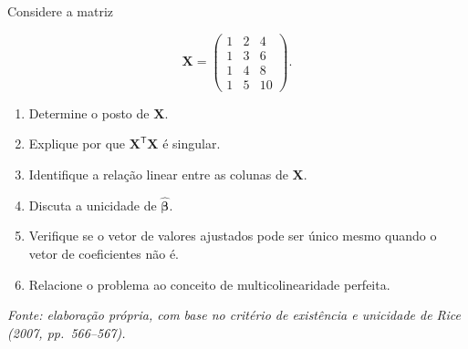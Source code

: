 \documentclass[
  letterpaper,
  DIV=11,
  numbers=noendperiod]{scrreprt}
\providecommand{\tightlist}{%
  \setlength{\itemsep}{0pt}\setlength{\parskip}{0pt}}\usepackage{longtable,booktabs,array}
\begin{document}
\begin{tcolorbox}[enhanced jigsaw, colback=white, leftrule=.75mm, colbacktitle=quarto-callout-tip-color!10!white, breakable, titlerule=0mm, bottomtitle=1mm, title=\textcolor{quarto-callout-tip-color}{\faLightbulb}\hspace{0.5em}{Exercício 6 --- Falta de posto completo}, colframe=quarto-callout-tip-color-frame, toprule=.15mm, opacityback=0, bottomrule=.15mm, opacitybacktitle=0.6, arc=.35mm, toptitle=1mm, rightrule=.15mm, coltitle=black, left=2mm]

Considere a matriz

\[\mathbf{X}
=
\begin{pmatrix}
1&2&4\\
1&3&6\\
1&4&8\\
1&5&10
\end{pmatrix}.\]

\begin{enumerate}
\def\labelenumi{\arabic{enumi}.}
\tightlist
\item
  Determine o posto de \(\mathbf{X}\).
\item
  Explique por que \(\mathbf{X}^\mathsf{T}\mathbf{X}\) é singular.
\item
  Identifique a relação linear entre as colunas de \(\mathbf{X}\).
\item
  Discuta a unicidade de \(\widehat{\boldsymbol\beta}\).
\item
  Verifique se o vetor de valores ajustados pode ser único mesmo quando
  o vetor de coeficientes não é.
\item
  Relacione o problema ao conceito de multicolinearidade perfeita.
\end{enumerate}

\emph{Fonte: elaboração própria, com base no critério de existência e
unicidade de Rice (2007, pp.~566--567).}

\end{tcolorbox}
\end{document}
